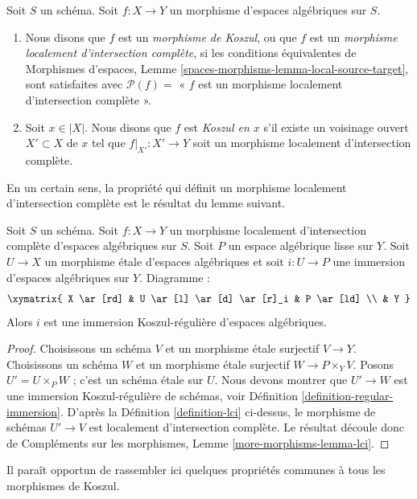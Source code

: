 \begin{definition}
\label{definition-lci}
Soit $S$ un schéma.
Soit $f : X \to Y$ un morphisme d'espaces algébriques sur $S$.
\begin{enumerate}
\item Nous disons que $f$ est un {\it morphisme de Koszul}, ou que $f$ est un
{\it morphisme localement d'intersection complète}, si les conditions équivalentes de
Morphismes d'espaces, Lemme \ref{spaces-morphisms-lemma-local-source-target},
sont satisfaites avec $\mathcal{P}(f) =$ « $f$ est un morphisme localement d'intersection complète ».
\item Soit $x \in |X|$. Nous disons que $f$ est {\it Koszul en $x$} s'il
existe un voisinage ouvert $X' \subset X$ de $x$ tel
que $f|_{X'} : X' \to Y$ soit un morphisme localement d'intersection complète.
\end{enumerate}
\end{definition}

\noindent
En un certain sens, la propriété qui définit un morphisme localement
d'intersection complète est le résultat du lemme suivant.

\begin{lemma}
\label{lemma-lci}
Soit $S$ un schéma.
Soit $f : X \to Y$ un morphisme localement d'intersection complète
d'espaces algébriques sur $S$.
Soit $P$ un espace algébrique lisse sur $Y$.
Soit $U \to X$ un morphisme étale d'espaces algébriques
et soit $i : U \to P$ une immersion d'espaces algébriques sur $Y$.
Diagramme :
$$
\xymatrix{
X \ar[rd] & U \ar[l] \ar[d] \ar[r]_i & P \ar[ld] \\
& Y
}
$$
Alors $i$ est une immersion Koszul-régulière d'espaces algébriques.
\end{lemma}

\begin{proof}
Choisissons un schéma $V$ et un morphisme étale surjectif $V \to Y$.
Choisissons un schéma $W$ et un morphisme étale surjectif $W \to P \times_Y V$.
Posons $U' = U \times_P W$ ; c'est un schéma étale sur $U$.
Nous devons montrer que $U' \to W$ est une immersion Koszul-régulière de
schémas, voir
Définition \ref{definition-regular-immersion}.
D'après la
Définition \ref{definition-lci}
ci-dessus, le morphisme de schémas $U' \to V$ est localement d'intersection
complète. Le résultat découle donc de
Compléments sur les morphismes, Lemme \ref{more-morphisms-lemma-lci}.
\end{proof}

\noindent
Il paraît opportun de rassembler ici quelques propriétés communes
à tous les morphismes de Koszul.

